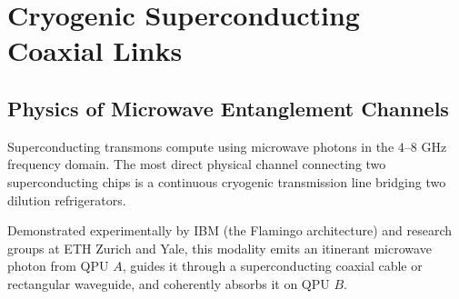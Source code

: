 \section{Cryogenic Superconducting Coaxial Links}
\label{sec:superconducting_links}

\subsection{Physics of Microwave Entanglement Channels}

Superconducting transmons compute using microwave photons in the $4\text{--}8\text{ GHz}$ frequency domain. The most direct physical channel connecting two superconducting chips is a continuous cryogenic transmission line bridging two dilution refrigerators.

Demonstrated experimentally by IBM (the Flamingo architecture) and research groups at ETH Zurich and Yale, this modality emits an itinerant microwave photon from QPU $A$, guides it through a superconducting coaxial cable or rectangular waveguide, and coherently absorbs it on QPU $B$.

